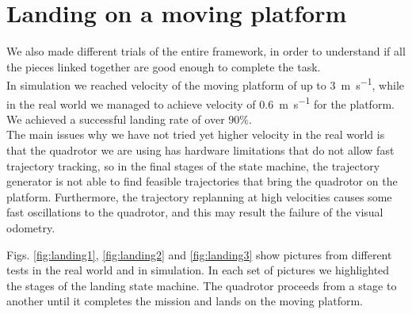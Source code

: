 \section{Landing on a moving platform}
We also made different trials of the entire framework, in order to understand if all the pieces linked together are good enough to complete the task.\\
In simulation we reached velocity of the moving platform of up to \SI{3}{\meter \per \second}, while in the real world we managed to achieve velocity of \SI{0.6}{\meter \per \second} for the platform. \\
We achieved a successful landing rate of over $90\%$.\\
The main issues why we have not tried yet higher velocity in the real world is that the quadrotor we are using has hardware limitations that do not allow fast trajectory tracking, so in the final stages of the state machine, the trajectory generator is not able to find feasible trajectories that bring the quadrotor on the platform. Furthermore, the trajectory replanning at high velocities causes some fast oscillations to the quadrotor, and this may result the failure of the visual odometry. 

Figs. \ref{fig:landing1},  \ref{fig:landing2} and  \ref{fig:landing3}  show pictures from different tests in the real world and in simulation. In each set of pictures we highlighted the stages of the landing state machine. The quadrotor proceeds from a stage to another until it completes the mission and lands on the moving platform.

